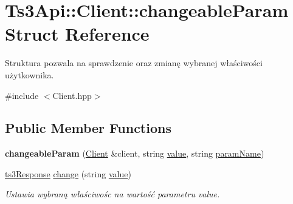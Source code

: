 \hypertarget{struct_ts3_api_1_1_client_1_1changeable_param}{}\section{Ts3\+Api\+:\+:Client\+:\+:changeable\+Param Struct Reference}
\label{struct_ts3_api_1_1_client_1_1changeable_param}


Struktura pozwala na sprawdzenie oraz zmianę wybranej właściwości użytkownika.  




{\ttfamily \#include $<$Client.\+hpp$>$}

\subsection*{Public Member Functions}
\begin{DoxyCompactItemize}
\item 
{\bfseries changeable\+Param} (\hyperlink{class_ts3_api_1_1_client}{Client} \&client, string \hyperlink{struct_ts3_api_1_1_client_1_1changeable_param_a4e3b8780f19688a682dc08e3e15912a3}{value}, string \hyperlink{struct_ts3_api_1_1_client_1_1changeable_param_a8fd9d911c39159e0139a7309d0d99e38}{param\+Name})\hypertarget{struct_ts3_api_1_1_client_1_1changeable_param_a1e378b376136300d1420542efc1e7e5d}{}\label{struct_ts3_api_1_1_client_1_1changeable_param_a1e378b376136300d1420542efc1e7e5d}

\item 
\hyperlink{struct_ts3_api_1_1ts3_response}{ts3\+Response} \hyperlink{struct_ts3_api_1_1_client_1_1changeable_param_ac3f3dd298ba1d2c0d5db342217c891af}{change} (string \hyperlink{struct_ts3_api_1_1_client_1_1changeable_param_a4e3b8780f19688a682dc08e3e15912a3}{value})
\begin{DoxyCompactList}\small\item\em Ustawia wybraną właściwośc na wartość parametru value. \end{DoxyCompactList}\end{DoxyCompactItemize}
